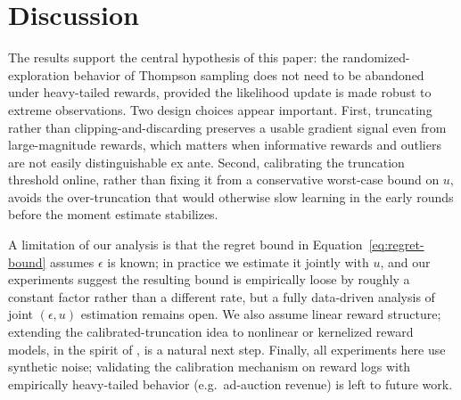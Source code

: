 \section{Discussion}
The results support the central hypothesis of this paper: the randomized-exploration behavior of Thompson sampling does not need to be abandoned under heavy-tailed rewards, provided the likelihood update is made robust to extreme observations. Two design choices appear important. First, truncating rather than clipping-and-discarding preserves a usable gradient signal even from large-magnitude rewards, which matters when informative rewards and outliers are not easily distinguishable ex ante. Second, calibrating the truncation threshold online, rather than fixing it from a conservative worst-case bound on $u$, avoids the over-truncation that would otherwise slow learning in the early rounds before the moment estimate stabilizes.

A limitation of our analysis is that the regret bound in Equation~\ref{eq:regret-bound} assumes $\epsilon$ is known; in practice we estimate it jointly with $u$, and our experiments suggest the resulting bound is empirically loose by roughly a constant factor rather than a different rate, but a fully data-driven analysis of joint $(\epsilon, u)$ estimation remains open. We also assume linear reward structure; extending the calibrated-truncation idea to nonlinear or kernelized reward models, in the spirit of \citet{pendelton2022sparse}, is a natural next step. Finally, all experiments here use synthetic noise; validating the calibration mechanism on reward logs with empirically heavy-tailed behavior (e.g.\ ad-auction revenue) is left to future work.
